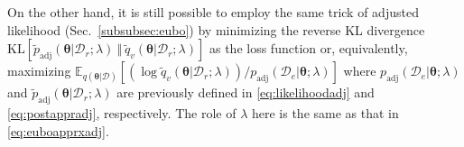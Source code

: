 \documentclass{article}
\theoremstyle{definition}
\newcommand{\mcl}[1]{\mathcal{#1}}
\newcommand{\mbb}[1]{\mathbb{#1}}
\newcommand{\da}{\mcl{D}}
\newcommand{\dc}{\mcl{D}_r}
\newcommand{\dr}{\mcl{D}_e}
\newcommand{\elbo}{\tilde{q}_v}
\begin{document}
%
%
On the other hand, it is still possible to employ the same trick of adjusted likelihood (Sec.~\ref{subsubsec:eubo}) by minimizing the reverse KL divergence  $\text{KL}[\tilde{p}_{\text{adj}}(\bm{\theta}|\dc; \lambda)\ \Vert\ \elbo(\bm{\theta}|\dc; \lambda)]$ as the loss function or, equivalently,  maximizing 
$\mbb{E}_{q(\bm{\theta}|\da)} [(\log \elbo(\bm{\theta}|\dc; \lambda))/p_{\text{adj}}(\dr|\bm{\theta}; \lambda) ]$
%
%
%
where $p_{\text{adj}}(\dr|\bm{\theta}; \lambda)$ and $\tilde{p}_{\text{adj}}(\bm{\theta}|\dc; \lambda)$ are previously defined in \eqref{eq:likelihoodadj} and \eqref{eq:postappradj}, respectively.
The role of $\lambda$ here is the same as that in \eqref{eq:euboapprxadj}. 
\end{document}
